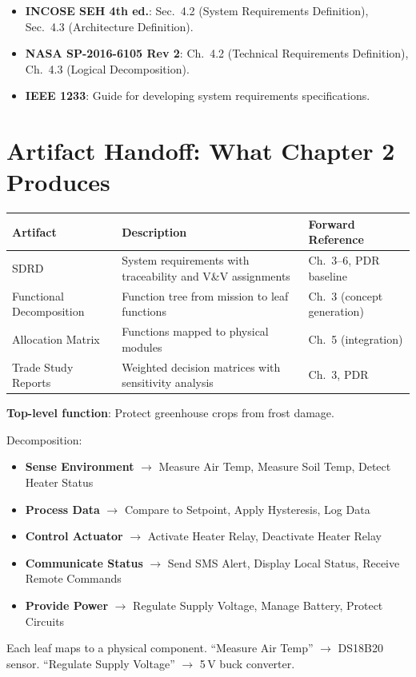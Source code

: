 \documentclass[11pt,letterpaper,twoside,openany]{book}
\begin{document}
\begin{keyconceptbox}
\begin{itemize}[nosep,leftmargin=1.5em]
\item \textbf{INCOSE SEH 4th ed.}: Sec.\ 4.2 (System Requirements Definition), Sec.\ 4.3 (Architecture Definition).
\item \textbf{NASA SP-2016-6105 Rev 2}: Ch.\ 4.2 (Technical Requirements Definition), Ch.\ 4.3 (Logical Decomposition).
\item \textbf{IEEE 1233}: Guide for developing system requirements specifications.
\end{itemize}
\end{keyconceptbox}

\section{Artifact Handoff: What Chapter 2 Produces}
\begin{table}[htbp]\centering\small
\begin{tabularx}{\textwidth}{l X l}
\toprule
\textbf{Artifact} & \textbf{Description} & \textbf{Forward Reference} \\
\midrule
SDRD & System requirements with traceability and V\&V assignments & Ch.~3--6, PDR baseline \\
Functional Decomposition & Function tree from mission to leaf functions & Ch.~3 (concept generation) \\
Allocation Matrix & Functions mapped to physical modules & Ch.~5 (integration) \\
Trade Study Reports & Weighted decision matrices with sensitivity analysis & Ch.~3, PDR \\
\bottomrule
\end{tabularx}
\end{table}


\begin{greenshieldbox}
\textbf{Top-level function}: Protect greenhouse crops from frost damage.

Decomposition:
\begin{itemize}[nosep,leftmargin=1.5em]
\item \textbf{Sense Environment} $\to$ Measure Air Temp, Measure Soil Temp, Detect Heater Status
\item \textbf{Process Data} $\to$ Compare to Setpoint, Apply Hysteresis, Log Data
\item \textbf{Control Actuator} $\to$ Activate Heater Relay, Deactivate Heater Relay
\item \textbf{Communicate Status} $\to$ Send SMS Alert, Display Local Status, Receive Remote Commands
\item \textbf{Provide Power} $\to$ Regulate Supply Voltage, Manage Battery, Protect Circuits
\end{itemize}
Each leaf maps to a physical component. ``Measure Air Temp'' $\to$ DS18B20 sensor. ``Regulate Supply Voltage'' $\to$ 5\,V buck converter.
\end{greenshieldbox}
\end{document}
